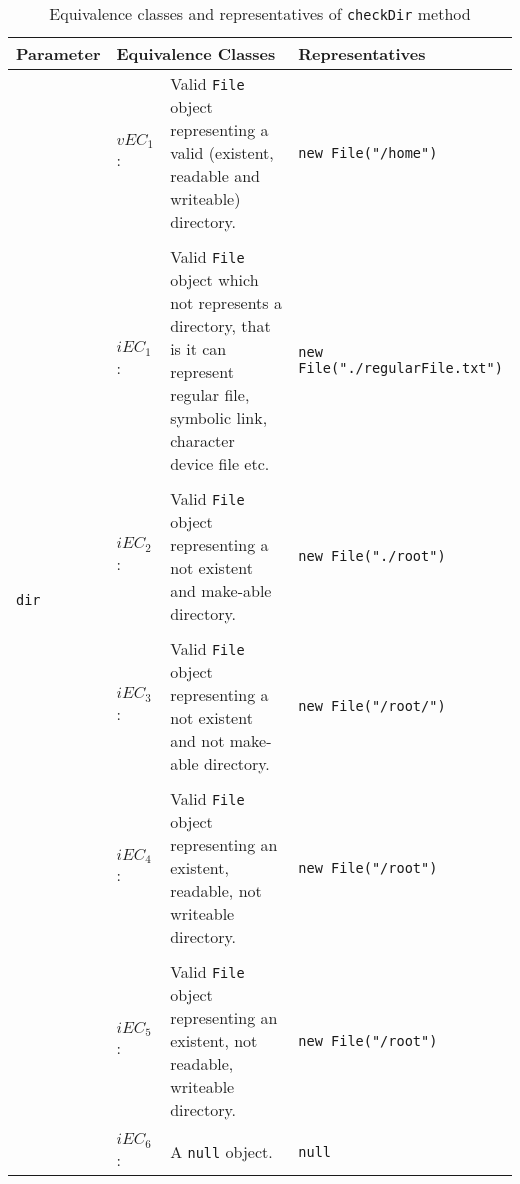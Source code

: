 \documentclass[conference]{IEEEtran}
\begin{document}
\begin{table}
  \caption{Equivalence classes and representatives of \texttt{checkDir} method}
  \label{tab:libraries}
  \begin{tabular}{llp{10cm}p{5cm}}
    \toprule
    \textbf{Parameter} & \multicolumn{2}{|l|}{\textbf{Equivalence Classes}} & \textbf{Representatives} \\
    \midrule
    
	\multirow{12}{*}{\texttt{dir}} & $vEC_1$: & Valid \texttt{File} object representing a valid (existent, readable and writeable) directory. & \texttt{new File("/home")} \\    
    
    \\[-1em] 
    & $iEC_1$: & Valid \texttt{File} object which not represents a directory, that is it can represent regular file, symbolic link, character device file etc. & \texttt{new File("./regularFile.txt")} \\ 
    
    \\[-1em]
    & $iEC_2$: & Valid \texttt{File} object representing a not existent and make-able directory. & \texttt{new File("./root")} \\
    
    \\[-1em]
    & $iEC_3$: & Valid \texttt{File} object representing a not existent and not make-able directory. & \texttt{new File("/root/")} \\
   
    \\[-1em]
    & $iEC_4$: & Valid \texttt{File} object representing an existent, readable, not writeable directory. & \texttt{new File("/root")} \\
    
 	\\[-1em]
    & $iEC_5$: & Valid \texttt{File} object representing an existent, not readable, writeable directory.  & \texttt{new File("/root")} \\    
    
	\\[-1em]
    & $iEC_6$: & A \texttt{null} object. & \texttt{null} \\     
    
    \bottomrule
  \end{tabular}
\end{table}
\end{document}
